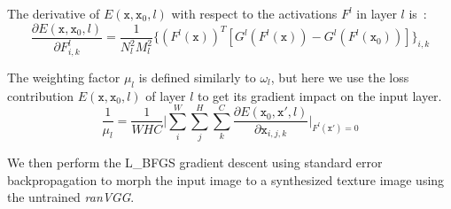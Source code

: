 \documentclass{article}
\begin{document}
The derivative of $E(\texttt{x},\texttt{x}_0,l)$ with respect to the activations $F^l$ in layer $l$ is~\cite{Gatys2015texture}:
\setlength{\belowdisplayskip}{2pt}
\setlength{\abovedisplayskip}{2pt}
\begin{equation}
\frac{\partial  E(\texttt{x},\texttt{x}_0,l)}{\partial{F^l_{i,k}}} = \frac{1}{N^2_l M^2_l}\{(F^l(\texttt{x}))^T [G^l(F^l(\texttt{x}))- G^l(F^l(\texttt{x}_0))]\}_{i,k}
\label{eq:textureLoss}
\end{equation}



The weighting factor $\mu_{l}$ is defined similarly to $\omega_{l}$,
 but here we use the loss contribution $E(\texttt{x},\texttt{x}_0,l)$ of layer $l$ to get its gradient impact on the input layer.
\setlength{\belowdisplayskip}{2pt}
\setlength{\abovedisplayskip}{2pt}
\begin{equation}
\frac{1}{\mu_{l}} =\frac{1}{W H C}\bigg|  \displaystyle{ \sum_{i}^{W}} \displaystyle{ \sum_{j}^{H}} \displaystyle{\sum_{k}^{C}}\frac{\partial E(\texttt{x}_0,\texttt{x}', l)}{\partial{\texttt{x}_{i,j,k}}} \bigg|_{F^l(\texttt{x}')=0}
\label{eq:TextureW}
\end{equation}

We then perform the L\_BFGS gradient descent using standard error backpropagation to morph the input image to a synthesized texture image using the untrained \emph{ranVGG}.
\end{document}
